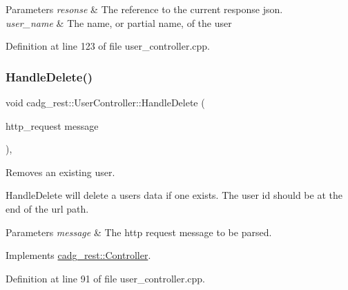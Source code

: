 \begin{DoxyParams}{Parameters}
{\em resonse} & The reference to the current response json. \\
\hline
{\em user\+\_\+name} & The name, or partial name, of the user \\
\hline
\end{DoxyParams}


Definition at line 123 of file user\+\_\+controller.\+cpp.

\mbox{\label{classcadg__rest_1_1_user_controller_a99ed4e9459766b3e000814b503378a2d}} 
\subsubsection{\texorpdfstring{HandleDelete()}{HandleDelete()}}
{\footnotesize\ttfamily void cadg\+\_\+rest\+::\+User\+Controller\+::\+Handle\+Delete (\begin{DoxyParamCaption}\item[{http\+\_\+request}]{message }\end{DoxyParamCaption})\hspace{0.3cm}{\ttfamily [override]}, {\ttfamily [virtual]}}



Removes an existing user. 

Handle\+Delete will delete a user\textquotesingle{}s data if one exists. The user id should be at the end of the url path.


\begin{DoxyParams}{Parameters}
{\em message} & The http request message to be parsed. \\
\hline
\end{DoxyParams}


Implements \mbox{\hyperlink{classcadg__rest_1_1_controller_a2aa889f1ffb53c6118667f1acf45d611}{cadg\+\_\+rest\+::\+Controller}}.



Definition at line 91 of file user\+\_\+controller.\+cpp.

\mbox{\label{classcadg__rest_1_1_user_controller_ae31aee8fecf0d1f7d0ba70c0e62da54d}} 
